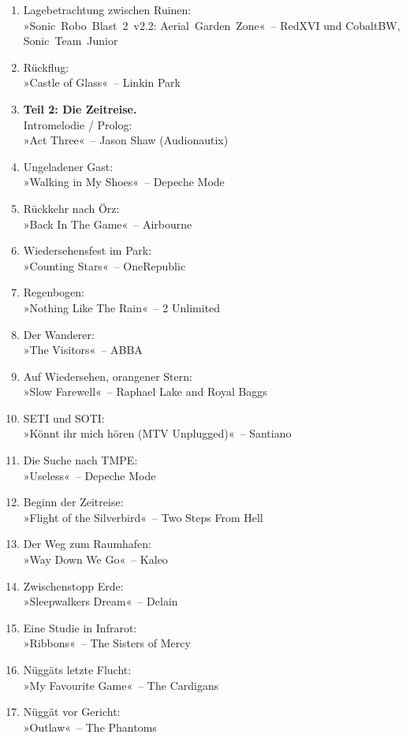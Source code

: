 \begin{enumerate}
    \item Lagebetrachtung zwischen Ruinen:\\ »Sonic~Robo~Blast~2~v2.2: Aerial~Garden~Zone«~– RedXVI und CobaltBW, Sonic~Team~Junior
    \item Rückflug:\\ »Castle of Glass«~– Linkin Park
    \item \textbf{Teil 2: Die Zeitreise.}\\ Intromelodie / Prolog:\\ »Act Three«~– Jason Shaw (Audionautix)
    \item Ungeladener Gast:\\ »Walking in My Shoes«~– Depeche Mode
    \item Rückkehr nach Örz:\\ »Back In The Game«~– Airbourne
    \item Wiedersehensfest im Park:\\ »Counting Stars«~– OneRepublic
    \item Regenbogen:\\ »Nothing Like The Rain«~– 2 Unlimited
    \item Der Wanderer:\\ »The Visitors«~– ABBA
    \item Auf Wiedersehen, orangener Stern:\\ »Slow Farewell«~– Raphael Lake and Royal Baggs
    \item SETI und SOTI:\\ »Könnt ihr mich hören (MTV Unplugged)«~– Santiano
    \item Die Suche nach TMPE:\\ »Useless«~– Depeche Mode
    \item Beginn der Zeitreise:\\ »Flight of the Silverbird«~– Two Steps From Hell
    \item Der Weg zum Raumhafen:\\ »Way Down We Go«~– Kaleo
    \item Zwischenstopp Erde:\\ »Sleepwalkers Dream«~– Delain
    \item Eine Studie in Infrarot:\\ »Ribbons«~– The Sisters of Mercy
    \item Nüggäts letzte Flucht:\\ »My Favourite Game«~– The Cardigans
    \item Nüggät vor Gericht:\\ »Outlaw«~– The Phantoms

\end{enumerate}
